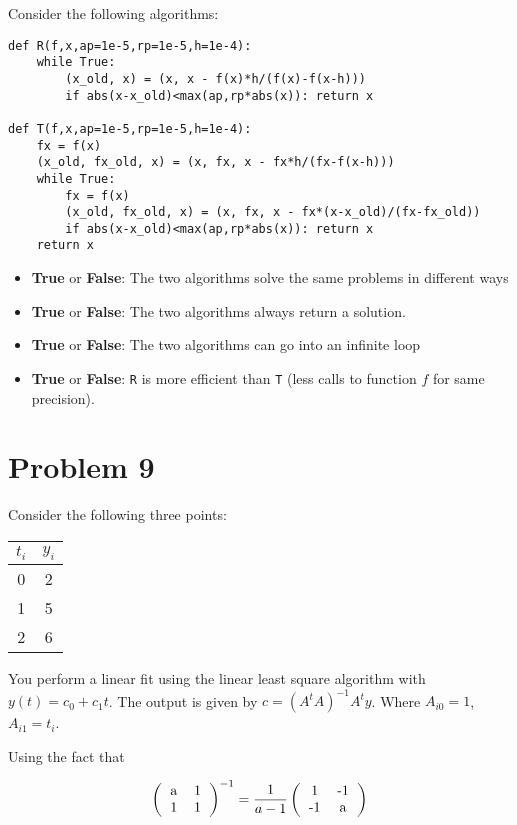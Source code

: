 \documentclass[12pt]{article}
\begin{document}
\noindent Consider the following algorithms:

\begin{verbatim}
def R(f,x,ap=1e-5,rp=1e-5,h=1e-4):
    while True:
        (x_old, x) = (x, x - f(x)*h/(f(x)-f(x-h)))
        if abs(x-x_old)<max(ap,rp*abs(x)): return x

def T(f,x,ap=1e-5,rp=1e-5,h=1e-4):
    fx = f(x)
    (x_old, fx_old, x) = (x, fx, x - fx*h/(fx-f(x-h)))
    while True:
        fx = f(x)
        (x_old, fx_old, x) = (x, fx, x - fx*(x-x_old)/(fx-fx_old))
        if abs(x-x_old)<max(ap,rp*abs(x)): return x
    return x
\end{verbatim}

\begin{itemize}
\item {\bf True} or {\bf False}: The two algorithms solve the same problems in different ways
\item {\bf True} or {\bf False}: The two algorithms always return a solution.
\item {\bf True} or {\bf False}: The two algorithms can go into an infinite loop
\item {\bf True} or {\bf False}: {\tt R} is more efficient than {\tt T} (less calls to function $f$ for same precision).
\end{itemize} 

\newpage\section{Problem 9}

\noindent Consider the following three points:

\begin{tabular}{cc} \hline
$t_i$ & $y_i$ \\ \hline
0 & 2 \\
1 & 5 \\
2 & 6
\end{tabular}

\noindent You perform a linear fit using the linear least square algorithm with $y(t) = c_0 + c_1 t$. The output is given by $c = (A^t A)^{-1} A^t y$. Where $A_{i0} = 1$, $A_{i1}=t_i$.

\noindent Using the fact that 

\[
\left( \begin{tabular}{cc} a & 1\\ 1 & 1\end{tabular}\right)^{-1} = \frac1{a-1}
\left( \begin{tabular}{cc} 1 & -1\\ -1 & a\end{tabular}\right)
\]
\end{document}
